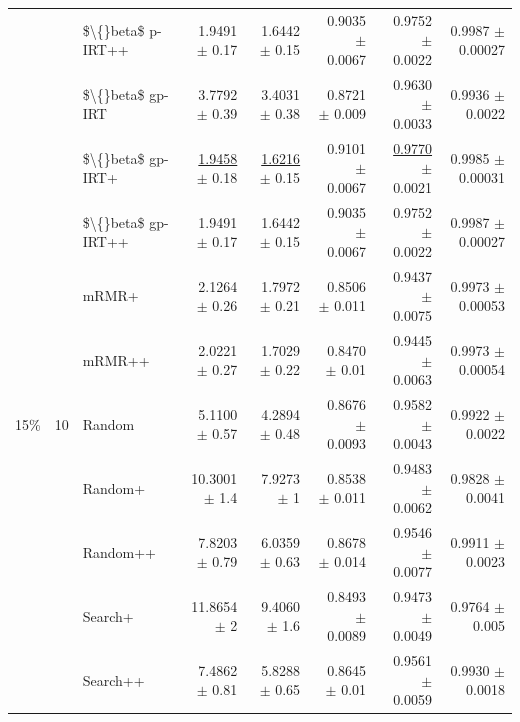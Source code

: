 \begin{longtable}{llp{}rrrrr}
 &  & \$\textbackslash\{\}beta\$ p-IRT++ & 1.9491 {\scriptsize $\pm$ 0.17} & 1.6442 {\scriptsize $\pm$ 0.15} & 0.9035 {\scriptsize $\pm$ 0.0067} & 0.9752 {\scriptsize $\pm$ 0.0022} & 0.9987 {\scriptsize $\pm$ 0.00027} \\
 &  & \$\textbackslash\{\}beta\$ gp-IRT & 3.7792 {\scriptsize $\pm$ 0.39} & 3.4031 {\scriptsize $\pm$ 0.38} & 0.8721 {\scriptsize $\pm$ 0.009} & 0.9630 {\scriptsize $\pm$ 0.0033} & 0.9936 {\scriptsize $\pm$ 0.0022} \\
 &  & \$\textbackslash\{\}beta\$ gp-IRT+ & \underline{1.9458} {\scriptsize $\pm$ 0.18} & \underline{1.6216} {\scriptsize $\pm$ 0.15} & 0.9101 {\scriptsize $\pm$ 0.0067} & \underline{0.9770} {\scriptsize $\pm$ 0.0021} & 0.9985 {\scriptsize $\pm$ 0.00031} \\
 &  & \$\textbackslash\{\}beta\$ gp-IRT++ & 1.9491 {\scriptsize $\pm$ 0.17} & 1.6442 {\scriptsize $\pm$ 0.15} & 0.9035 {\scriptsize $\pm$ 0.0067} & 0.9752 {\scriptsize $\pm$ 0.0022} & 0.9987 {\scriptsize $\pm$ 0.00027} \\
 &  & mRMR+ & 2.1264 {\scriptsize $\pm$ 0.26} & 1.7972 {\scriptsize $\pm$ 0.21} & 0.8506 {\scriptsize $\pm$ 0.011} & 0.9437 {\scriptsize $\pm$ 0.0075} & 0.9973 {\scriptsize $\pm$ 0.00053} \\
 &  & mRMR++ & 2.0221 {\scriptsize $\pm$ 0.27} & 1.7029 {\scriptsize $\pm$ 0.22} & 0.8470 {\scriptsize $\pm$ 0.01} & 0.9445 {\scriptsize $\pm$ 0.0063} & 0.9973 {\scriptsize $\pm$ 0.00054} \\
\midrule
15\% & 10 & Random & 5.1100 {\scriptsize $\pm$ 0.57} & 4.2894 {\scriptsize $\pm$ 0.48} & 0.8676 {\scriptsize $\pm$ 0.0093} & 0.9582 {\scriptsize $\pm$ 0.0043} & 0.9922 {\scriptsize $\pm$ 0.0022} \\
 &  & Random+ & 10.3001 {\scriptsize $\pm$ 1.4} & 7.9273 {\scriptsize $\pm$ 1} & 0.8538 {\scriptsize $\pm$ 0.011} & 0.9483 {\scriptsize $\pm$ 0.0062} & 0.9828 {\scriptsize $\pm$ 0.0041} \\
 &  & Random++ & 7.8203 {\scriptsize $\pm$ 0.79} & 6.0359 {\scriptsize $\pm$ 0.63} & 0.8678 {\scriptsize $\pm$ 0.014} & 0.9546 {\scriptsize $\pm$ 0.0077} & 0.9911 {\scriptsize $\pm$ 0.0023} \\
 &  & Search+ & 11.8654 {\scriptsize $\pm$ 2} & 9.4060 {\scriptsize $\pm$ 1.6} & 0.8493 {\scriptsize $\pm$ 0.0089} & 0.9473 {\scriptsize $\pm$ 0.0049} & 0.9764 {\scriptsize $\pm$ 0.005} \\
 &  & Search++ & 7.4862 {\scriptsize $\pm$ 0.81} & 5.8288 {\scriptsize $\pm$ 0.65} & 0.8645 {\scriptsize $\pm$ 0.01} & 0.9561 {\scriptsize $\pm$ 0.0059} & 0.9930 {\scriptsize $\pm$ 0.0018} \\

\end{longtable}
